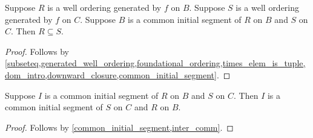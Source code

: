 \begin{lemma}\label{common_initial_segment_relation_subseteq}
    Suppose $R$ is a well ordering generated by $f$ on $B$.
    Suppose $S$ is a well ordering generated by $f$ on $C$.
    Suppose $B$ is a common initial segment of $R$ on $B$ and $S$ on $C$.
    Then $R\subseteq S$.
\end{lemma}
\begin{proof}
    Follows by \cref{subseteq,generated_well_ordering,foundational_ordering,times_elem_is_tuple,dom_intro,downward_closure,common_initial_segment}.
\end{proof}

\begin{lemma}\label{common_initial_segment_symmetric}
    Suppose $I$ is a common initial segment of $R$ on $B$ and $S$ on $C$.
    Then $I$ is a common initial segment of $S$ on $C$ and $R$ on $B$.
\end{lemma}
\begin{proof}
    Follows by \cref{common_initial_segment,inter_comm}.
\end{proof}

